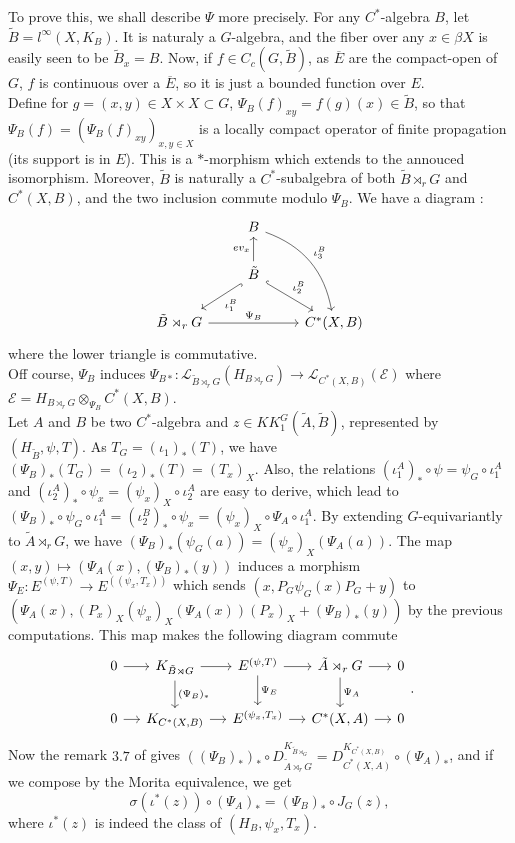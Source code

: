 To prove this, we shall describe $\Psi$ more precisely. For any $C^*$-algebra $B$, let $\tilde B = l^\infty (X,K_B)$. It is naturaly a $G$-algebra, and the fiber over any $x\in\beta X$ is easily seen to be $\tilde B_x = B$. Now, if $f\in C_c(G, \tilde B)$, as $\overline E$ are the compact-open of $G$, $f$ is continuous over a $\overline E$, so it is just a bounded function over $E$.\\
Define for $g=(x,y)\in X\times X\subset G$,
$\Psi_B(f)_{xy}=f(g)(x)\in \tilde B$,
so that $\Psi_B(f)=(\Psi_B(f)_{xy})_{x,y\in X}$ is a locally compact operator of finite propagation (its support is in $E$). This is a $*$-morphism which extends to the annouced isomorphism. Moreover, $\tilde B$ is naturally a $C^*$-subalgebra of both $\tilde B\rtimes_r G$ and $C^*(X,B)$, and the two inclusion commute modulo $\Psi_B$. We have a diagram :
\[\begin{tikzcd} 
  \  & B \arrow[bend left]{rdd}{\iota_3^B}& \\
  \ &\tilde B \arrow{u}{ev_x}\arrow[hookrightarrow]{ld}{\iota_1^B}\arrow[hookrightarrow]{rd}{\iota_2^B} &  \\ 
\tilde B\rtimes_rG \arrow{rr}{\Psi_B} &  &  C^*(X,B) 
\end{tikzcd}\] 
where the lower triangle is commutative.\\

Off course, $\Psi_B$ induces $\Psi_{B*} : \mathcal L_{\tilde B\rtimes_r G}(H_{B\rtimes_r G})\rightarrow \mathcal L_{C^*(X,B)}(\mathcal E)$ where $\mathcal E = H_{B\rtimes_r G}\otimes_{\Psi_B} C^*(X,B)$. \\
Let $A$ and $B$ be two $C^*$-algebra and $z\in KK_1^G(\tilde A,\tilde B)$, represented by $(H_{\tilde B}, \psi, T)$. As $T_G = (\iota_1)_*(T)$, we have $(\Psi_B)_*(T_G)=(\iota_2)_*(T)=(T_x)_X$. Also, the relations $(\iota_1^A)_*\circ\psi = \psi_G\circ \iota_1^A$ and $(\iota_2^A)_*\circ\psi_x = (\psi_x)_X\circ \iota_2^A$ are easy to derive, which lead to $(\Psi_B)_*\circ \psi_G \circ \iota_1^A= (\iota_2^B)_*\circ \psi_x = (\psi_x)_X\circ \Psi_A\circ \iota_1^A$. By extending $G$-equivariantly to $\tilde A  \rtimes_r G$, we have $(\Psi_B)_*(\psi_G(a))=(\psi_x)_X(\Psi_A(a))$. The map $(x,y)\mapsto (\Psi_A(x), (\Psi_B)_*(y))$ induces a morphism $\Psi_E : E^{(\psi,T)}  \rightarrow  E^{((\psi_x,T_x))}$ which sends 
$(x,P_G \psi_G(x)P_G + y)$ to $(\Psi_A(x), (P_x)_X(\psi_x)_X(\Psi_A(x))(P_x)_X+(\Psi_B)_*(y))$ by the previous computations. This map makes the following diagram commute
\[
\begin{tikzcd}[column sep = small]
0\arrow{r} & K_{\tilde B\rtimes G}\arrow{r}\arrow{d}{(\Psi_B)_*} & E^{(\psi,T)} \arrow{r}\arrow{d}{\Psi_E}& \tilde A\rtimes_r G\arrow{r}\arrow{d}{\Psi_A} & 0\\
0\arrow{r} & K_{C^*(X,B)}\arrow{r} & E^{(\psi_x,T_x)} \arrow{r}& C^*(X,A)\arrow{r} & 0
\end{tikzcd}.
\]
Now the remark $3.7$ of \cite{OY2} gives $((\Psi_B)_*)_*\circ D_{\tilde A\rtimes_rG}^{K_{\tilde B\rtimes_G}} = D_{C^*(X,A)}^{K_{C^*(X,B)}}\circ (\Psi_A)_*$, and if we compose by the Morita equivalence, we get 
\[\sigma(\iota^*(z)) \circ (\Psi_A)_* = (\Psi_B)_*\circ J_G(z),\]
where $\iota^*(z)$ is indeed the class of $(H_B, \psi_x,T_x)$.\\

